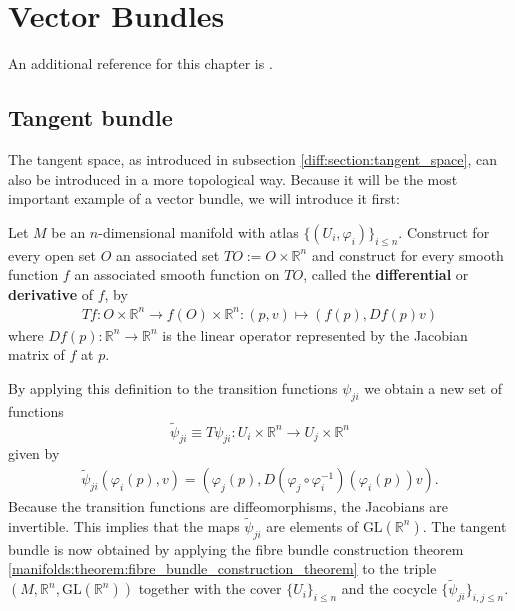 \chapter{Vector Bundles}\label{chapter:vector_bundles}

    An additional reference for this chapter is \cite{bott_tu}.

\section{Tangent bundle}

    The tangent space, as introduced in subsection \ref{diff:section:tangent_space}, can also be introduced in a more topological way. Because it will be the most important example of a vector bundle, we will introduce it first:
    \begin{construct}
        Let $M$ be an $n$-dimensional manifold with atlas $\{(U_i, \varphi_i)\}_{i\leq n}$. Construct for every open set $O$ an associated set $TO := O\times\mathbb{R}^n$ and construct for every smooth function $f$ an associated smooth function on $TO$, called the \textbf{differential} or \textbf{derivative} of $f$, by
        \begin{gather}
            \label{diff:manifolds:T_function}
            Tf:O\times\mathbb{R}^n\rightarrow f(O)\times\mathbb{R}^n:(p,v)\mapsto(f(p),Df(p)v)
        \end{gather}
        where $Df(p):\mathbb{R}^n\rightarrow\mathbb{R}^n$ is the linear operator represented by the Jacobian matrix of $f$ at $p$.

        By applying this definition to the transition functions $\psi_{ji}$ we obtain a new set of functions \[\widetilde{\psi}_{ji} \equiv T\psi_{ji}:U_i\times\mathbb{R}^n\rightarrow U_j\times\mathbb{R}^n\] given by
        \begin{gather}
            \widetilde{\psi}_{ji}(\varphi_i(p),v) = \left(\varphi_j(p),D(\varphi_j\circ\varphi_i^{-1})(\varphi_i(p))v\right).
        \end{gather}
        Because the transition functions are diffeomorphisms, the Jacobians are invertible. This implies that the maps $\widetilde\psi_{ji}$ are elements of $\text{GL}(\mathbb{R}^n)$. The tangent bundle is now obtained by applying the fibre bundle construction theorem \ref{manifolds:theorem:fibre_bundle_construction_theorem} to the triple $(M, \mathbb{R}^n,\text{GL}(\mathbb{R}^n))$ together with the cover $\{U_i\}_{i\leq n}$ and the cocycle $\{\widetilde\psi_{ji}\}_{i,j\leq n}$.
    \end{construct}


